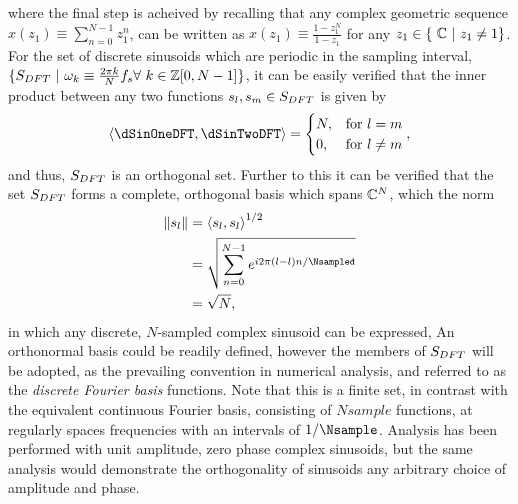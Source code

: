 where the final step is acheived by recalling that any complex geometric sequence $x(z_1) \equiv \sum_{n=0}^{N - 1} z_1^n$, can be written as $x(z_1)
\equiv \frac{1-z_1^N}{1-z_1}$ for any $z_1 \in \{\ \mathbb{C}\ |\ z_1 \ne 1
\}$.
For the set of discrete sinusoids which are periodic in the sampling interval,
$\{ S_{DFT}\ |\ \omega_k \equiv \frac{2 \pi k }{N} f_s \forall\ k \in \mathbb{Z}[0,N-1] \}$, it can be easily verified that the inner product between any two functions $s_l, s_m \in S_{DFT}$ is given by
$$
\left< \dSinOneDFT, \dSinTwoDFT \right> =
    \begin{cases}
      N, & \text{for}\ \dSinOneIndex = \dSinTwoIndex \\
      0, & \text{for}\ \dSinOneIndex \ne \dSinTwoIndex
    \end{cases},
$$
and thus, $S_{DFT}$ is an orthogonal set. Further to this it can be verified that the set $S_{DFT}$ forms a complete, orthogonal basis which spans $\mathbb{C}^{N}$, which the norm
\begin{align*}
  \norm{\dSinOne}
  &= \left< \dSinOne, \dSinOne\right>^{1/2} \\
  &= \sqrt{ \DFTsum e^{i 2 \pi(\dSinOneIndex-\dSinOneIndex) \nDFT / \Nsampled} }
\\ &= \sqrt{N}
,
\end{align*}
in which any discrete, $N$-sampled complex sinusoid can be expressed, 
An orthonormal basis could be readily defined, however the members of $S_{DFT}$ will be adopted, as the prevailing convention in numerical analysis, and referred to as the \textit{ discrete Fourier basis } functions. Note that this is a finite set, in contrast with the equivalent continuous Fourier basis, consisting of $Nsample$ functions, at regularly spaces frequencies with an intervals of $ 1 / \Nsample$.
Analysis has been performed with unit amplitude, zero phase complex sinusoids, but the same analysis would demonstrate the orthogonality of sinusoids any arbitrary choice of amplitude and phase.


